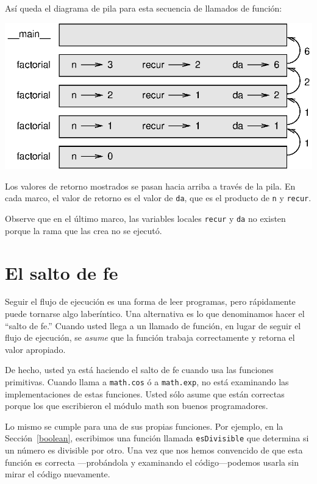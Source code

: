 Así queda el diagrama de pila para esta secuencia de llamados de función:

\vspace{0.1in}
 \beforefig \centerline{\includegraphics{illustrations/stack3}}
\afterfig \vspace{0.1in}

Los valores de retorno mostrados se pasan hacia arriba a través de
la pila. En cada marco, el valor de retorno es el valor de \texttt{da},
que es el producto de \texttt{n} y \texttt{recur}.

Observe que en el último marco, las variables locales \texttt{recur}
y \texttt{da} no existen porque la rama que las crea no se ejecutó.

\section{El salto de fe}

 

Seguir el flujo de ejecución es una forma de leer programas, pero
rápidamente puede tornarse algo laberíntico. Una alternativa es lo
que denominamos hacer el ``salto de fe.'' Cuando usted llega a un
llamado de función, en lugar de seguir el flujo de ejecución, se {\em
asume} que la función trabaja correctamente y retorna el valor apropiado.

De hecho, usted ya está haciendo el salto de fe cuando usa las funciones
primitivas. Cuando llama a \texttt{math.cos} ó a \texttt{math.exp},
no está examinando las implementaciones de estas funciones. Usted
sólo asume que están correctas porque los que escribieron el módulo
math son buenos programadores.

Lo mismo se cumple para una de sus propias funciones. Por ejemplo,
en la Sección~\ref{boolean}, escribimos una función llamada \texttt{esDivisible}
que determina si un número es divisible por otro. Una vez que nos
hemos convencido de que esta función es correcta —probándola y examinando
el código—podemos usarla sin mirar el código nuevamente.

